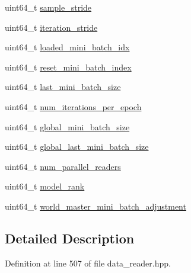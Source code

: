 \begin{DoxyCompactItemize}
\item 
uint64\+\_\+t \hyperlink{structlbann_1_1generic__data__reader_1_1packing__header_a0e7c5e52b37e0690ef0f73baa6a1fbac}{sample\+\_\+stride}
\item 
uint64\+\_\+t \hyperlink{structlbann_1_1generic__data__reader_1_1packing__header_a585ea45a1cd4907a9309da4e2bbe08bc}{iteration\+\_\+stride}
\item 
uint64\+\_\+t \hyperlink{structlbann_1_1generic__data__reader_1_1packing__header_a4f12fee3dc7159d8ffc074a7f7d34c50}{loaded\+\_\+mini\+\_\+batch\+\_\+idx}
\item 
uint64\+\_\+t \hyperlink{structlbann_1_1generic__data__reader_1_1packing__header_aed568ca6ff6cb037f96cfdb84b3d602c}{reset\+\_\+mini\+\_\+batch\+\_\+index}
\item 
uint64\+\_\+t \hyperlink{structlbann_1_1generic__data__reader_1_1packing__header_a40e9c95809480591f5e3ba587a2b77db}{last\+\_\+mini\+\_\+batch\+\_\+size}
\item 
uint64\+\_\+t \hyperlink{structlbann_1_1generic__data__reader_1_1packing__header_a8c55e3df9e613f62d85d8970c545254e}{num\+\_\+iterations\+\_\+per\+\_\+epoch}
\item 
uint64\+\_\+t \hyperlink{structlbann_1_1generic__data__reader_1_1packing__header_a9f877bbf01412d6d803d84bab8eaf8e5}{global\+\_\+mini\+\_\+batch\+\_\+size}
\item 
uint64\+\_\+t \hyperlink{structlbann_1_1generic__data__reader_1_1packing__header_a17405a9dd003909f82b60b3b27de606a}{global\+\_\+last\+\_\+mini\+\_\+batch\+\_\+size}
\item 
uint64\+\_\+t \hyperlink{structlbann_1_1generic__data__reader_1_1packing__header_a8fcecefba35fc2a1e37089334416724d}{num\+\_\+parallel\+\_\+readers}
\item 
uint64\+\_\+t \hyperlink{structlbann_1_1generic__data__reader_1_1packing__header_ad1b269b53e3d41a364412654e0bfecae}{model\+\_\+rank}
\item 
uint64\+\_\+t \hyperlink{structlbann_1_1generic__data__reader_1_1packing__header_a77d3532c5bb5e2dd2b382f0a58ff2f40}{world\+\_\+master\+\_\+mini\+\_\+batch\+\_\+adjustment}
\end{DoxyCompactItemize}


\subsection{Detailed Description}


Definition at line 507 of file data\+\_\+reader.\+hpp.



